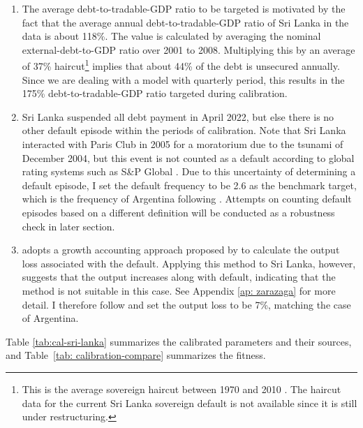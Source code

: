\begin{enumerate}[label = (\roman*)]
    \item
    The average debt-to-tradable-GDP ratio to be targeted is motivated by the fact that the average annual debt-to-tradable-GDP ratio of Sri Lanka in the data is about 118\%.
    The value is calculated by averaging the nominal external-debt-to-GDP ratio over 2001 to 2008\footnotemark{}.
    Multiplying this by an average of 37\% haircut\footnote{This is the average sovereign haircut between 1970 and 2010 \citep{Cruces-Trebesch-13}. The haircut data for the current Sri Lanka sovereign default is not available since it is still under restructuring.} implies that about 44\% of the debt is unsecured annually\footnotemark{}.
    Since we are dealing with a model with quarterly period, this results in the 175\% debt-to-tradable-GDP ratio targeted during calibration.
    \item
    Sri Lanka suspended all debt payment in April 2022, but else there is no other default episode within the periods of calibration. Note that Sri Lanka interacted with Paris Club in 2005 for a moratorium due to the tsunami of December 2004, but this event is not counted as a default according to global rating systems such as S\&P Global \citep{SPGlobal-default-report}.
    Due to this uncertainty of determining a default episode, I set the default frequency to be 2.6 as the benchmark target, which is the frequency of Argentina following \citet{Na-18}. Attempts on counting default episodes based on a different definition will be conducted as a robustness check in later section.
    \item  \citet{Na-18} adopts a growth accounting approach proposed by \citet{zarazaga-12} to calculate the output loss associated with the default. Applying this method to Sri Lanka, however, suggests that the output increases along with default, indicating that the method is not suitable in this case. See Appendix \ref{ap: zarazaga} for more detail. I therefore follow \citet{Na-18} and set the output loss to be 7\%, matching the case of Argentina.
\end{enumerate}
Table \ref{tab:cal-sri-lanka} summarizes the calibrated parameters and their sources, and Table~\ref{tab: calibration-compare} summarizes the fitness.


